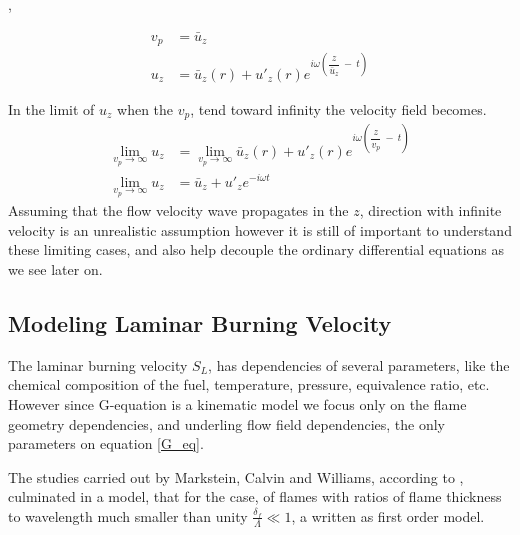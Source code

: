  \cite{schuller_2002}, \cite{baillot_1992}


\begin{assumption}
\begin{align}
	v_p&=\bar{u}_z\\
	u_z&=\bar{u}_z(r) + u'_z(r)e^{i\omega\left(\dfrac{z}{\bar{u}_z}\ -\ t\right)}
\end{align}
\label{u_avg_ass}
\end{assumption}

\begin{assumption}
In the limit of $u_z$ when the $v_p$, tend toward infinity the velocity field becomes.
\begin{align}
	\lim_{v_p \to \infty}u_z&=\lim_{v_p \to \infty}\bar{u}_z(r) + u'_z(r)e^{i\omega\left(\dfrac{z}{v_p}\ -\ t\right)}\nonumber \\
	\lim_{v_p \to \infty}u_z&=\bar{u}_z + u'_z e^{-i\omega t}
\end{align}
Assuming that the flow velocity wave propagates in the $z$, direction with infinite velocity is an unrealistic assumption however it is still of important to understand these limiting cases, and also help decouple the ordinary differential equations as we see later on.
\label{u_inf_ass}
\end{assumption}


\newpage
\subsection{Modeling Laminar Burning Velocity}
The laminar burning velocity $S_L$, has dependencies of several parameters, like the chemical composition of the fuel, temperature, pressure, equivalence ratio, etc. However since G-equation is a kinematic model we focus only on the flame geometry dependencies, and underling flow field dependencies, the only parameters on equation \eqref{G_eq}.

The studies carried out by Markstein, Calvin and Williams, according to \cite{bradley_1996}, culminated in a model, that for the case, of flames with ratios of flame thickness to wavelength much smaller than unity $\frac{\delta_f}{\Lambda}\ll 1$, a written as first order model. 

